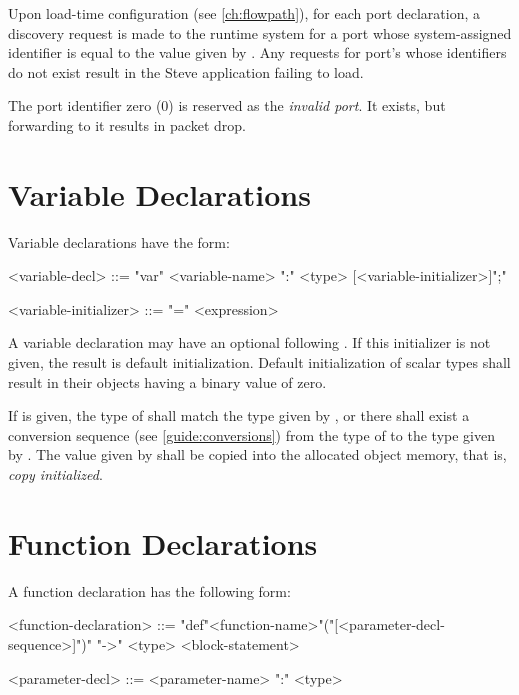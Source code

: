 Upon load-time configuration (see \ref{ch:flowpath}), for each port declaration, a discovery request is made to the runtime system for a port whose system-assigned identifier is equal to the value given by . Any requests for port's whose identifiers do not exist result in the Steve application failing to load.

The port identifier zero (0) is reserved as the \textit{invalid port}. It exists, but forwarding to it results in packet drop.

\section{Variable Declarations} \label{guide:variables}

Variable declarations have the form:

\begin{minip}
\begin{grammar}
<variable-decl> ::=
"var" <variable-name> ":" <type> [<variable-initializer>]";"

<variable-initializer> ::= "=" <expression>
\end{grammar}
\end{minip}

A variable declaration may have an optional  following .  If this initializer is not given, the result is default initialization. Default initialization of scalar types shall result in their objects having a binary value of zero.

If  is given, the type of  shall match the type given by , or there shall exist a conversion sequence (see \ref{guide:conversions}) from the type of  to the type given by . The value given by  shall be copied into the allocated object memory, that is, \textit{copy initialized}.

\section{Function Declarations} \label{guide:function}

A function declaration has the following form:

\begin{minip}
\begin{grammar}
<function-declaration> ::=
"def"<function-name>"("[<parameter-decl-sequence>]")" "->" <type> <block-statement>

<parameter-decl> ::= <parameter-name> ":" <type>
\end{grammar}
\end{minip}

